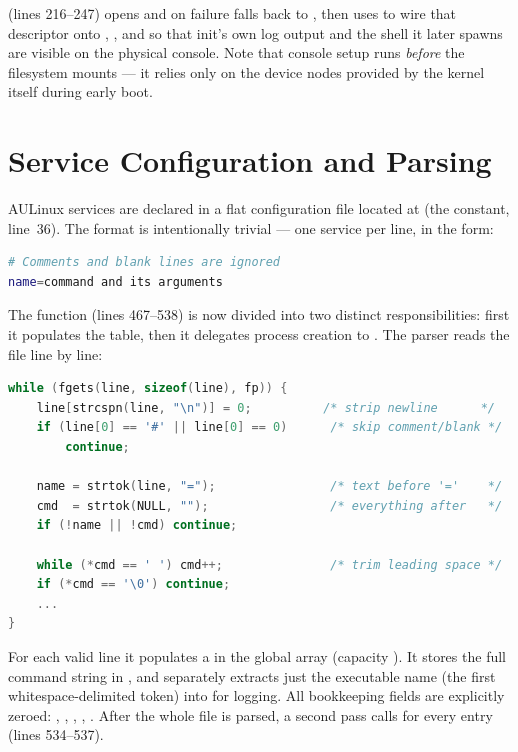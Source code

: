  (lines 216--247) opens  and on failure
falls back to , then uses  to wire that descriptor
onto , , and  so that init's own log output
and the shell it later spawns are visible on the physical console. Note that
console setup runs \emph{before} the filesystem mounts --- it relies only on the
device nodes provided by the kernel itself during early boot.

\section{Service Configuration and Parsing}

AULinux services are declared in a flat configuration file located at
 (the  constant, line~36).
The format is intentionally trivial --- one service per line, in the form:

\begin{lstlisting}[language=bash, caption={The services.conf line format}]
# Comments and blank lines are ignored
name=command and its arguments
\end{lstlisting}

The  function (lines 467--538) is now divided into two
distinct responsibilities: first it populates the  table, then
it delegates process creation to . The parser reads the
file line by line:

\begin{lstlisting}[language=C, caption={Parsing a service definition line}]
while (fgets(line, sizeof(line), fp)) {
    line[strcspn(line, "\n")] = 0;          /* strip newline      */
    if (line[0] == '#' || line[0] == 0)      /* skip comment/blank */
        continue;

    name = strtok(line, "=");                /* text before '='    */
    cmd  = strtok(NULL, "");                 /* everything after   */
    if (!name || !cmd) continue;

    while (*cmd == ' ') cmd++;               /* trim leading space */
    if (*cmd == '\0') continue;
    ...
}
\end{lstlisting}

For each valid line it populates a  in the global
 array (capacity ). It stores the full
command string in , and separately extracts just the
executable name (the first whitespace-delimited token) into  for
logging. All bookkeeping fields are explicitly zeroed: ,
, , ,
. After the whole file is parsed, a second pass calls
 for every entry (lines 534--537).

